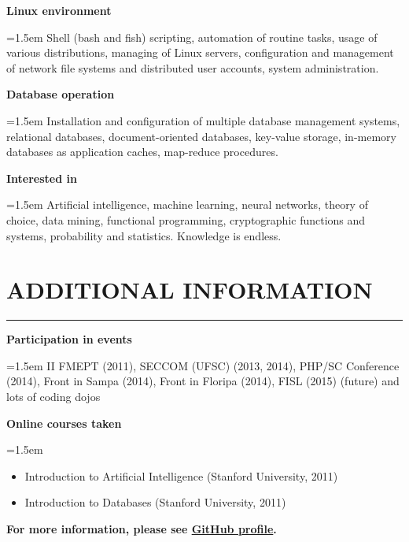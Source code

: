 \documentclass{article}
\def\emcolor{blue!25!black}
\newcommand{\fgem}{\color{\emcolor}}%
\newcommand{\skillentry}[2]{%
	\noindent \textbf{#1} \hfill \par
	\noindent \hangindent=1.5em \hangafter=0 \small #2 \par
	\normalsize
	\vspace{1em}
}
\newcommand{\additionalentry}[2]{%
	\noindent \textbf{#1} \par
	\noindent \hangindent=1.5em \hangafter=0 \small #2 \par
	\normalsize
	\vspace{1em}
}
\newenvironment{main}{%
\noindent
\begin{minipage}[t]{\dimexpr0.75\textwidth-1.5em}%
\let\oldsection\section
\renewcommand{\section}[1]{\oldsection*{\uppercase{\fgem ##1}}\vspace{-0.5em}\hrule\vspace{1em}}
}{%
\let\section\oldsection
\end{minipage}%
}
\begin{document}
\begin{main}
\skillentry{Linux environment}{Shell (bash and fish) scripting, automation of routine tasks, usage of various distributions, managing of Linux servers, configuration and management of network file systems and distributed user accounts, system administration.}

\skillentry{Database operation}{Installation and configuration of multiple database management systems, relational databases, document-oriented databases, key-value storage, in-memory databases as application caches, map-reduce procedures.}

\skillentry{Interested in}{Artificial intelligence, machine learning, neural networks, theory of choice, data mining, functional programming, cryptographic functions and systems, probability and statistics. Knowledge is endless.}


\section{Additional Information}
\additionalentry{Participation in events}{II FMEPT (2011), SECCOM (UFSC) (2013, 2014), PHP/SC Conference (2014), Front in Sampa (2014), Front in Floripa (2014), FISL (2015) (future) and lots of coding dojos}

\additionalentry{Online courses taken}{\begin{itemize} \itemsep0em \parsep0em \parskip0em
\vspace{-0.5em}%
\item{Introduction to Artificial Intelligence (Stanford University, 2011)}
\item{Introduction to Databases (Stanford University, 2011)}
\vspace{-0.5em}%
\end{itemize}}

\textbf{For more information, please see \href{https://github.com/ranisalt}{GitHub profile}.}


\end{main}%
\end{document}
